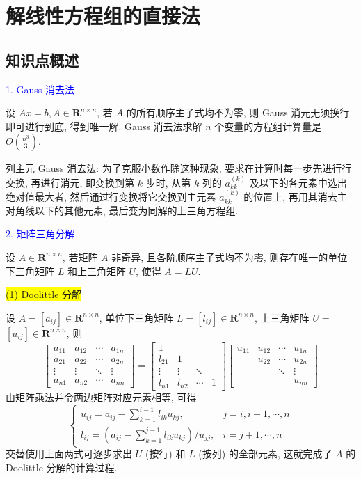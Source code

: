\newpage
\section{解线性方程组的直接法}
\subsection{知识点概述}

\textcolor{blue}{1. Gauss 消去法}

设 $ A x=b, A \in \mathbf{R}^{n \times n} $, 若 $ A $ 的所有顺序主子式均不为零, 则 Gauss 消元无须换行即可进行到底, 得到唯一解. Gauss 消去法求解 $ n $ 个变量的方程组计算量是 $ O\left(\frac{n^{3}}{3}\right) $.

列主元 Gauss 消去法: 为了克服小数作除这种现象, 要求在计算时每一步先进行行交换, 再进行消元, 即变换到第 $ k $ 步时, 从第 $ k $ 列的 $ a_{k k}^{(k)} $ 及以下的各元素中选出绝对值最大者, 然后通过行变换将它交换到主元素 $ a_{k k}^{(k)} $ 的位置上, 再用其消去主对角线以下的其他元素, 最后变为同解的上三角方程组.

\textcolor{blue}{2. 矩阵三角分解}

设 $ A \in \mathbf{R}^{n \times n} $, 若矩阵 $ A $ 非奇异, 且各阶顺序主子式均不为零, 则存在唯一的单位下三角矩阵 $ L $ 和上三角矩阵 $ U $, 使得 $ A=L U $.

\colorbox{yellow}{(1) Doolittle 分解}

设 $ A=\left[a_{i j}\right] \in \mathbf{R}^{n \times n} $, 单位下三角矩阵 $ L=\left[l_{i j}\right] \in \mathbf{R}^{n \times n} $, 上三角矩阵 $ U= $ $ \left[u_{i j}\right] \in \mathbf{R}^{n \times n} $, 则
$$
\left[\begin{array}{cccc}
a_{11} & a_{12} & \cdots & a_{1 n} \\
a_{21} & a_{22} & \cdots & a_{2 n} \\
\vdots & \vdots & \ddots & \vdots \\
a_{n 1} & a_{n 2} & \cdots & a_{n n}
\end{array}\right]=\left[\begin{array}{cccc}
1 & & & \\
l_{21} & 1 & & \\
\vdots & \vdots & \ddots & \\
l_{n 1} & l_{n 2} & \cdots & 1
\end{array}\right]\left[\begin{array}{cccc}
u_{11} & u_{12} & \cdots & u_{1 n} \\
& u_{22} & \cdots & u_{2 n} \\
& & \ddots & \vdots \\
& & & u_{n n}
\end{array}\right]
$$
由矩阵乘法并令两边矩阵对应元素相等, 可得
$$
\left\{\begin{array}{ll}
u_{i j}=a_{i j}-\sum\limits_{k=1}^{i-1} l_{i k} u_{k j}, & j=i, i+1, \cdots, n \\
l_{i j}=\left(a_{i j}-\sum\limits_{k=1}^{j-1} l_{i k} u_{k j}\right) / u_{j j}, & i=j+1, \cdots, n
\end{array}\right.
$$
交替使用上面两式可逐步求出 $ U $ (按行) 和 $ L $ (按列) 的全部元素, 这就完成了 $ A $ 的 Doolittle 分解的计算过程.

